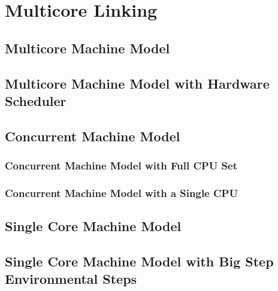 \section{Multicore Linking}
\label{chapter:conlink:sec:multicore-linking}


\subsection{Multicore Machine Model}
\label{chapter:conlink:subsec:multicore-machine-model}


\subsection{Multicore Machine Model with Hardware Scheduler}
\label{chapter:conlink:subsec:multicore-machine-model-with-hardware-scheduler}


\subsection{Concurrent Machine Model}
\label{chapter:conlink:subsec:multicore-machine-model}


\subsubsection{Concurrent Machine Model with Full CPU Set}


\subsubsection{Concurrent Machine Model with a Single CPU}



\subsection{Single Core Machine Model}
\label{chapter:conlink:subsec:single-core-machine-model}


\subsection{Single Core Machine Model with Big Step Environmental Steps}
\label{chapter:conlink:subsec:single-core-machine-model-with-big-step-env-steps}

